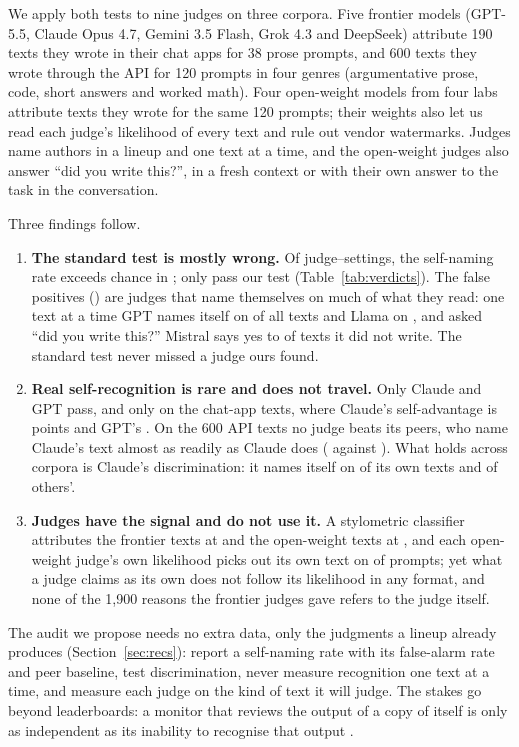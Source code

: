 We apply both tests to nine judges on three corpora. Five frontier models
(GPT-5.5, Claude Opus 4.7, Gemini 3.5 Flash, Grok 4.3 and DeepSeek)
attribute 190 texts they wrote in their chat apps for 38 prose prompts, and
600 texts they wrote through the API for 120 prompts in four genres
(argumentative prose, code, short answers and worked math). Four
open-weight models from four labs attribute \OWNResponses{} texts they wrote
for the same 120 prompts; their weights also let us read each judge's
likelihood of every text and rule out vendor watermarks. Judges name authors
in a lineup and one text at a time, and the open-weight judges also answer
``did you write this?'', in a fresh context or with their own answer to the
task in the conversation.

Three findings follow.
\begin{enumerate}
\item \textbf{The standard test is mostly wrong.} Of \SVPCells{}
judge--settings, the self-naming rate exceeds chance in \SVPStd{}; only
\SVPProper{} pass our test (Table~\ref{tab:verdicts}). The \SVPFalse{} false
positives (\SVPFalsePct{}) are judges that name themselves on much of what
they read: one text at a time GPT names itself on \FXGPTSingleNamesSelf{} of
all texts and Llama on \OWLlamaSingleNamesSelf{}, and asked ``did you write
this?'' Mistral says yes to \OWMistralBinaryFA{} of texts it did not write.
The standard test never missed a judge ours found.
\item \textbf{Real self-recognition is rare and does not travel.} Only Claude
and GPT pass, and only on the chat-app texts, where Claude's self-advantage
is \ClaudeAdvLineup{} points \ClaudeAdvLineupCI{} and GPT's \GPTAdvLineup{}.
On the 600 API texts no judge beats its peers, who name Claude's text almost
as readily as Claude does (\FXClaudeLineupPeer{} against
\FXClaudeLineupSelf{}). What holds across corpora is Claude's
discrimination: it names itself on \FXClaudeLineupSelf{} of its own texts and
\FXClaudeLineupFA{} of others'.
\item \textbf{Judges have the signal and do not use it.} A stylometric
classifier attributes the frontier texts at \EngineAAcc{} and the open-weight
texts at \OWClfPooled{}, and each open-weight judge's own likelihood picks
out its own text on \OWLikCondAccMin{} of prompts; yet what a judge claims as
its own does not follow its likelihood in any format, and none of the 1,900
reasons the frontier judges gave refers to the judge itself.
\end{enumerate}

The audit we propose needs no extra data, only the judgments a lineup
already produces (Section~\ref{sec:recs}): report a self-naming rate with its
false-alarm rate and peer baseline, test discrimination, never measure
recognition one text at a time, and measure each judge on the kind of text
it will judge. The stakes go beyond leaderboards: a monitor that reviews the
output of a copy of itself is only as independent as its inability to
recognise that output \citep{khullar2026selfattribution}.
